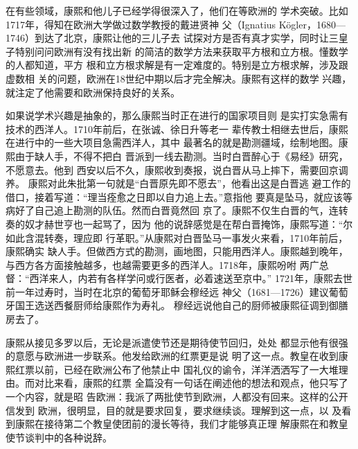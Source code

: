 在有些领域，康熙和他儿子已经学得很深入了，他们在等欧洲的%
学术突破。比如1717年，得知在欧洲大学做过数学教授的戴进贤神%
父（Ignatius Kögler，1680—1746）到达了北京，康熙让他的三儿子去%
试探对方是否有真才实学，同时让三皇子特别问问欧洲有没有找出新%
的简洁的数学方法来获取平方根和立方根。懂数学的人都知道，平方%
根和立方根求解是有一定难度的。特别是立方根求解，涉及跟虚数相%
关的问题，欧洲在18世纪中期以后才完全解决。康熙有这样的数学%
兴趣，就注定了他需要和欧洲保持良好的关系。%
\par
如果说学术兴趣是抽象的，那么康熙当时正在进行的国家项目则%
是实打实急需有技术的西洋人。1710年前后，在张诚、徐日升等老一%
辈传教士相继去世后，康熙在进行中的一些大项目急需西洋人，其中%
最著名的就是勘测疆域，绘制地图。康熙由于缺人手，不得不把白%
晋派到一线去勘测。当时白晋醉心于《易经》研究，不愿意去。他到%
西安以后不久，康熙收到奏报，说白晋从马上摔下，需要回京调养。%
康熙对此朱批第一句就是“白晋原先即不愿去”，他看出这是白晋逃%
避工作的借口，接着写道：“理当痊愈之日即以自力追上去。”意指他%
要真是坠马，就应该等病好了自己追上勘测的队伍。然而白晋竟然回%
京了。康熙不仅生白晋的气，连转奏的奴才赫世亨也一起骂了，因为%
他的说辞感觉是在帮白晋掩饰，康熙写道：“尔如此含混转奏，理应即%
行革职。”从康熙对白晋坠马一事发火来看，1710年前后，康熙确实%
缺人手。但做西方式的勘测，画地图，只能用西洋人。康熙越到晚年，%
与西方各方面接触越多，也越需要更多的西洋人。1718年，康熙吩咐%
两广总督：“西洋来人，内若有各样学问或行医者，必着速送至京中。”%
1721年，康熙去世前一年过寿时，当时在北京的葡萄牙耶稣会穆经远%
神父（1681—1726）建议葡萄牙国王选送西餐厨师给康熙作为寿礼。%
穆经远说他自己的厨师被康熙征调到御膳房去了。%
\par
康熙从接见多罗以后，无论是派遣使节还是期待使节回归，处处%
都显示他有很强的意愿与欧洲进一步联系。他发给欧洲的红票更是说%
明了这一点。教皇在收到康熙红票以前，已经在欧洲公布了他禁止中%
国礼仪的谕令，洋洋洒洒写了一大堆理由。而对比来看，康熙的红票%
全篇没有一句话在阐述他的想法和观点，他只写了一个内容，就是昭%
告欧洲：我派了两批使节到欧洲，人都没有回来。这样的公开信发到%
欧洲，很明显，目的就是要求回复，要求继续谈。理解到这一点，以%
及看到康熙在接待第二个教皇使团前的漫长等待，我们才能够真正理%
解康熙在和教皇使节谈判中的各种说辞。%
